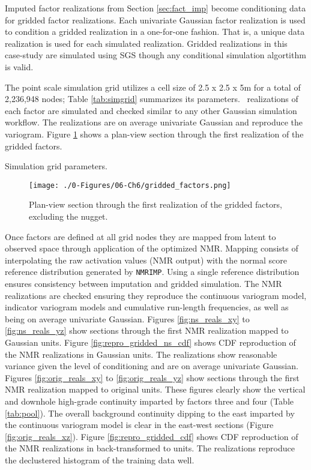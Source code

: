 Imputed factor realizations from Section \ref{sec:fact_imp} become conditioning data for gridded factor realizations. Each univariate Gaussian factor realization is used to condition a gridded realization in a one-for-one fashion. That is, a unique data realization is used for each simulated realization. Gridded realizations in this case-study are simulated using \gls{SGS} though any conditional simulation algortithm is valid.

The point scale simulation grid utilizes a cell size of 2.5 x 2.5 x 5m for a total of 2,236,948 nodes; Table \ref{tab:simgrid} summarizes its parameters. \csnreals \ realizations of each factor are simulated and checked similar to any other Gaussian simulation workflow. The realizations are on average univariate Gaussian and reproduce the variogram. Figure \ref{fig:gridded_factors} shows a plan-view section through the first realization of the gridded factors.

\begin{table}[!htb]
    \centering
    \caption{Simulation grid parameters.}
    \resizebox{0.9\width}{!}{}
    \label{tab:simgrid}
\end{table}

\begin{figure}[htb!]
    \centering
    \texttt{[image: ./0-Figures/06-Ch6/gridded\_factors.png]}
    \caption{Plan-view section through the first realization of the gridded factors, excluding the nugget.}
    \label{fig:gridded_factors}
\end{figure}

Once factors are defined at all grid nodes they are mapped from latent to observed space through application of the optimized \gls{NMR}. Mapping consists of interpolating the raw activation values (\gls{NMR} output) with the normal score reference distribution generated by \texttt{NMRIMP}. Using a single reference distribution ensures consistency between imputation and gridded simulation. The \gls{NMR} realizations are checked ensuring they reproduce the continuous variogram model, indicator variogram models and cumulative run-length frequencies, as well as being on average univariate Gaussian. Figures \ref{fig:ns_reals_xy} to \ref{fig:ns_reals_yz} show sections through the first \gls{NMR} realization mapped to Gaussian units. Figure \ref{fig:repro_gridded_ns_cdf} shows \gls{CDF} reproduction of the \gls{NMR} realizations in Gaussian units. The realizations show reasonable variance given the level of conditioning and are on average univariate Gaussian. Figures \ref{fig:orig_reals_xy} to \ref{fig:orig_reals_yz} show sections through the first \gls{NMR} realization mapped to original units. These figures clearly show the vertical and downhole high-grade continuity imparted by factors three and four (Table \ref{tab:pool}). The overall background continuity dipping to the east imparted by the continuous variogram model is clear in the east-west sections (Figure \ref{fig:orig_reals_xz}). Figure \ref{fig:repro_gridded_cdf} shows \gls{CDF} reproduction of the \gls{NMR} realizations in back-transformed to units. The realizations reproduce the declustered histogram of the training data well.


